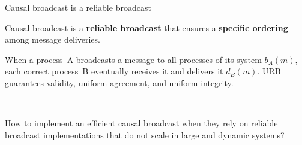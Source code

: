 \documentclass[10pt, xcolor={usenames, dvipsnames}]{beamer}
\begin{document}
\begin{frame}{Causal broadcast is a reliable broadcast}

  Causal broadcast is a \textbf{reliable broadcast} that ensures a
  \textbf{specific ordering} among message deliveries.
  
  \vspace{1em}

  \begin{definition} 
    When a process~A broadcasts a message to all processes of its system $b_A(m)$,
    each correct process~B eventually receives it and delivers it
    $d_B(m)$. URB guarantees validity, uniform agreement, and uniform integrity.
  \end{definition}

  \begin{minipage}{0.49\textwidth} %
      
  \end{minipage}~~~
  \begin{minipage}{0.49\textwidth} %
    \begin{center}
      
    \end{center}
  \end{minipage}
  
  

  
\end{frame}

\begin{frame}[standout]
  
  How to implement an efficient causal broadcast when they rely on reliable
  broadcast implementations that do not scale in large and dynamic systems?
  
\end{frame}
\end{document}
